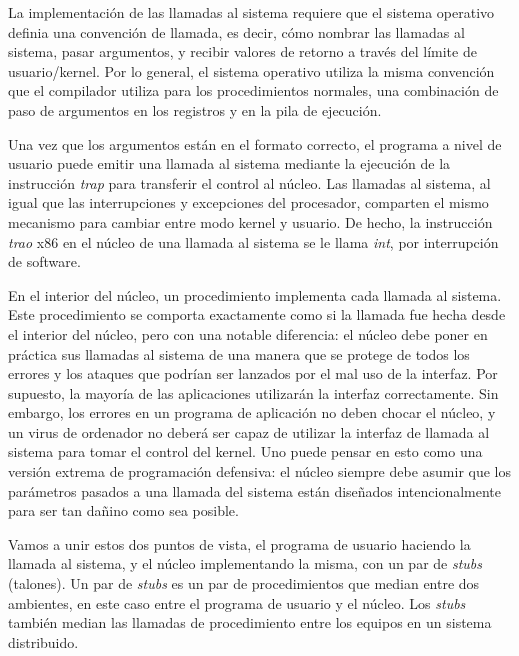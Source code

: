 \documentclass[10pt]{book}
\begin{document}
La implementación de las llamadas al sistema requiere que el sistema operativo definia una convención de llamada, es decir, cómo nombrar las llamadas al sistema, pasar argumentos, y recibir valores de retorno a través del límite de usuario/kernel. Por lo general, el sistema operativo utiliza la misma convención que el compilador utiliza para los procedimientos normales, una combinación de paso de argumentos en los registros y en la pila de ejecución.

Una vez que los argumentos están en el formato correcto, el programa a nivel de usuario puede emitir una llamada al sistema mediante la ejecución de la instrucción \textit{trap} para transferir el control al núcleo. Las llamadas al sistema, al igual que las interrupciones y excepciones del procesador, comparten el mismo mecanismo para cambiar entre modo kernel y usuario. De hecho, la instrucción \textit{trao} x$86$ en el núcleo de una llamada al sistema se le llama \textit{int}, por interrupción de software.

En el interior del núcleo, un procedimiento implementa cada llamada al sistema. Este procedimiento se comporta exactamente como si la llamada fue hecha desde el interior del núcleo, pero con una notable diferencia: el núcleo debe poner en práctica sus llamadas al sistema de una manera que se protege de todos los errores y los ataques que podrían ser lanzados por el mal uso de la interfaz. Por supuesto, la mayoría de las aplicaciones utilizarán la interfaz correctamente. Sin embargo, los errores en un programa de aplicación no deben chocar el núcleo, y un virus de ordenador no deberá ser capaz de utilizar la interfaz de llamada al sistema para tomar el control del kernel. Uno puede pensar en esto como una versión extrema de programación defensiva: el núcleo siempre debe asumir que los parámetros pasados a una llamada del sistema están diseñados intencionalmente para ser tan dañino como sea posible.

Vamos a unir estos dos puntos de vista, el programa de usuario haciendo la llamada al sistema, y el núcleo implementando la misma, con un par de \textit{stubs} (talones). Un par de \textit{stubs} es un par de procedimientos que median entre dos ambientes, en este caso entre el programa de usuario y el núcleo. Los \textit{stubs} también median las llamadas de procedimiento entre los equipos en un sistema distribuido.
\end{document}
